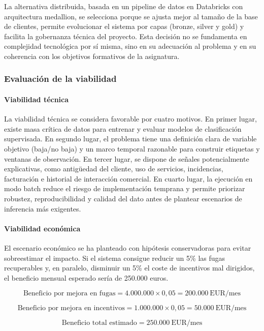\documentclass[12pt,a4paper]{article}
\begin{document}
La alternativa distribuida, basada en un pipeline de datos en Databricks con arquitectura medallion, se selecciona porque se ajusta mejor al tamaño de la base de clientes, permite evolucionar el sistema por capas (bronze, silver y gold) y facilita la gobernanza técnica del proyecto. Esta decisión no se fundamenta en complejidad tecnológica por sí misma, sino en su adecuación al problema y en su coherencia con los objetivos formativos de la asignatura.

\subsubsection{Evaluación de la viabilidad}

\paragraph{Viabilidad técnica}

La viabilidad técnica se considera favorable por cuatro motivos. En primer lugar, existe masa crítica de datos para entrenar y evaluar modelos de clasificación supervisada. En segundo lugar, el problema tiene una definición clara de variable objetivo (baja/no baja) y un marco temporal razonable para construir etiquetas y ventanas de observación. En tercer lugar, se dispone de señales potencialmente explicativas, como antigüedad del cliente, uso de servicios, incidencias, facturación e historial de interacción comercial. En cuarto lugar, la ejecución en modo batch reduce el riesgo de implementación temprana y permite priorizar robustez, reproducibilidad y calidad del dato antes de plantear escenarios de inferencia más exigentes.

\paragraph{Viabilidad económica}

El escenario económico se ha planteado con hipótesis conservadoras para evitar sobreestimar el impacto. Si el sistema consigue reducir un 5\% las fugas recuperables y, en paralelo, disminuir un 5\% el coste de incentivos mal dirigidos, el beneficio mensual esperado sería de 250.000 euros.

\[
\text{Beneficio por mejora en fugas} = 4.000.000 \times 0{,}05 = 200.000\ \text{EUR/mes}
\]

\[
\text{Beneficio por mejora en incentivos} = 1.000.000 \times 0{,}05 = 50.000\ \text{EUR/mes}
\]

\[
\text{Beneficio total estimado} = 250.000\ \text{EUR/mes}
\]
\end{document}
